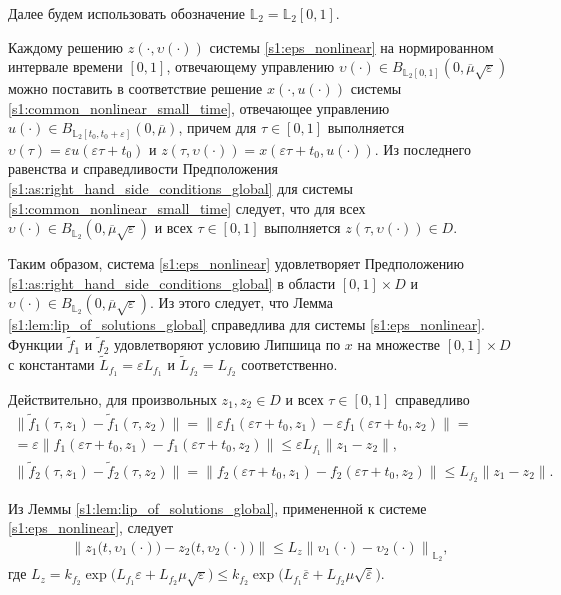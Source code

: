 \documentclass[../main.tex]{subfiles}
\begin{document}
Далее будем использовать обозначение $\mathbb{L}_2 = \mathbb{L}_2[0, 1]$. 

Каждому решению $z(\cdot, \upsilon(\cdot))$ системы \eqref{s1:eps_nonlinear} на нормированном интервале времени $[0, 1]$, отвечающему управлению $\upsilon(\cdot) \in B_{\mathbb{L}_2[0, 1]} (0, \overline{\mu} \sqrt{\varepsilon})$ можно поставить в соответствие решение $x(\cdot, u(\cdot))$ системы \eqref{s1:common_nonlinear_small_time}, отвечающее управлению $u(\cdot) \in B_{\mathbb{L}_2[t_0, t_0 + \varepsilon]} (0, \overline{\mu})$, причем для $\tau \in [0, 1] $ выполняется $ \upsilon(\tau) = \varepsilon u(\varepsilon \tau + t_0)$ и $ z(\tau, \upsilon(\cdot)) = x(\varepsilon \tau + t_0, u(\cdot)) $.
Из последнего равенства и справедливости Предположения \ref{s1:as:right_hand_side_conditions_global} для системы \eqref{s1:common_nonlinear_small_time} следует, что для всех $\upsilon(\cdot) \in B_{\mathbb{L}_2}(0, \overline{\mu}\sqrt{\varepsilon})$ и всех $\tau \in [0, 1] $ выполняется $z(\tau, \upsilon(\cdot)) \in D$. 

Таким образом, система \eqref{s1:eps_nonlinear} удовлетворяет Предположению \ref{s1:as:right_hand_side_conditions_global} в области $[0, 1]\times D$ и $\upsilon(\cdot) \in B_{\mathbb{L}_2}(0, \overline{\mu}\sqrt{\varepsilon}) $.
Из этого следует, что Лемма \ref{s1:lem:lip_of_solutions_global} справедлива для системы \eqref{s1:eps_nonlinear}.
Функции $\widetilde{f}_1$ и $\widetilde{f}_2$ удовлетворяют условию Липшица по $x$ на множестве $[0, 1]\times D$ с константами $\widetilde{L}_{f_1} = \varepsilon L_{f_1} $ и $\widetilde{L}_{f_2} = L_{f_2} $ соответственно. 

Действительно, для произвольных $z_1, z_2 \in D$ и всех $\tau \in [0, 1]$ справедливо
\begin{gather*}
	\| \widetilde{f}_1(\tau, z_1) - \widetilde{f}_1(\tau, z_2) \| = \| \varepsilon f_1(\varepsilon \tau + t_0, z_1) - \varepsilon f_1(\varepsilon \tau + t_0, z_2) \| = \\ =
	\varepsilon \| f_1(\varepsilon \tau + t_0, z_1) - f_1(\varepsilon \tau + t_0, z_2) \| \leqslant \varepsilon L_{f_1} \|z_1 - z_2 \|, \\
	\| \widetilde{f}_2 (\tau,z_1) - \widetilde{f}_2 (\tau,z_2) \| = \| f_2(\varepsilon \tau + t_0,z_1) - f_2(\varepsilon \tau + t_0,z_2) \| \leqslant L_{f_2} \|z_1 - z_2 \|.
\end{gather*}
 
Из Леммы \ref{s1:lem:lip_of_solutions_global}, примененной к системе \eqref{s1:eps_nonlinear}, следует
\begin{gather*}
 \left\| z_1\big(t, \upsilon_1(\cdot) \big) - z_2\big(t, \upsilon_2(\cdot)\big) \right\| \leqslant L_z \left\|\upsilon_1(\cdot) - \upsilon_2(\cdot) \right\|_{\mathbb{L}_2},
\end{gather*}
где $ L_z = k_{f_2} \exp\Big( L_{f_1} \varepsilon + L_{f_2} \mu \sqrt{\varepsilon} \Big) \leqslant k_{f_2} \exp\Big( L_{f_1} \overline{\varepsilon} + L_{f_2} \mu \sqrt{\overline{\varepsilon}} \Big)$.
 
\end{document}
